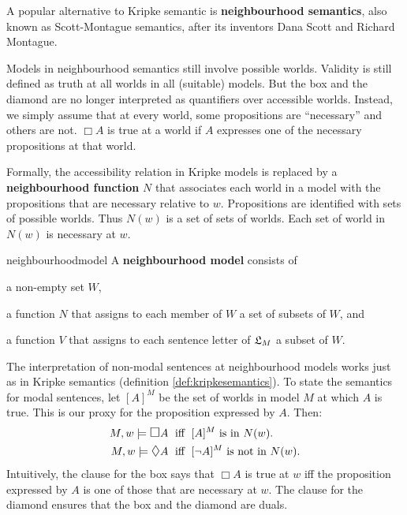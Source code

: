 
A popular alternative to Kripke semantic is \textbf{neighbourhood semantics},
also known as Scott-Montague semantics, after its inventors Dana Scott and
Richard Montague.

Models in neighbourhood semantics still involve possible worlds. Validity is
still defined as truth at all worlds in all (suitable) models. But the box and
the diamond are no longer interpreted as quantifiers over accessible
worlds. Instead, we simply assume that at every world, some propositions are
``necessary'' and others are not.  $\Box A$ is true at a world if $A$ expresses
one of the necessary propositions at that world.

Formally, the accessibility relation in Kripke models is replaced by a
\textbf{neighbourhood function} $N$ that associates each world in a model with
the propositions that are necessary relative to $w$. Propositions are identified
with sets of possible worlds. Thus $N(w)$ is a set of sets of worlds. Each set
of world in $N(w)$ is necessary at $w$.


\begin{definition}{}{neighbourhoodmodel}
  A \textbf{neighbourhood model} consists of
  \vspace{-3mm}
  \begin{itemize*}
  \item a non-empty set $W$,
  \item a function $N$ that assigns to each member of $W$ a set of subsets of
  $W$, and
  \item a function $V$ that assigns to each sentence letter of $\mathfrak{L}_M$
    a subset of $W$.
  \end{itemize*}
\end{definition}

The interpretation of non-modal sentences at neighbourhood models works just as
in Kripke semantics (definition \ref{def:kripkesemantics}). To state the
semantics for modal sentences, let $[A]^M$ be the set of worlds in model $M$ at
which $A$ is true. This is our proxy for the proposition expressed by $A$. Then:
%
\begin{align*}
  M,w \models \Box A &\text{ \;iff\; $[A]^M$ is in $N(w)$}.\\
  M,w \models \Diamond A &\text{ \;iff\; $[\neg A]^M$ is not in $N(w)$.}
\end{align*}
%
Intuitively, the clause for the box says that $\Box A$ is true at $w$ iff the
proposition expressed by $A$ is one of those that are necessary at $w$. The
clause for the diamond ensures that the box and the diamond are duals.

